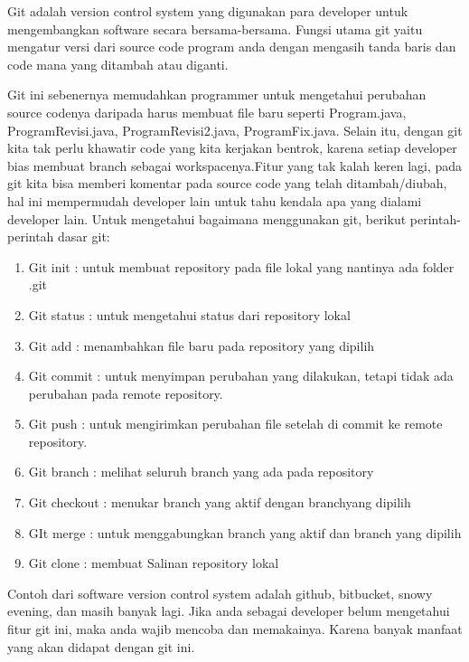 
Git adalah version control system yang digunakan para developer untuk 
mengembangkan software secara bersama-bersama. Fungsi utama git yaitu 
mengatur versi dari source code program anda dengan mengasih tanda baris 
dan code mana yang ditambah atau diganti.
\vspace{12pt}

Git ini sebenernya memudahkan programmer untuk mengetahui perubahan 
source codenya daripada harus membuat file baru seperti Program.java, 
ProgramRevisi.java, ProgramRevisi2.java, ProgramFix.java. Selain itu, 
dengan git kita tak perlu khawatir code yang kita kerjakan bentrok, 
karena setiap developer bias membuat branch sebagai workspacenya.Fitur 
yang tak kalah keren lagi, pada git kita bisa memberi komentar pada 
source code yang telah ditambah/diubah, hal ini mempermudah developer 
lain untuk tahu kendala apa yang dialami developer lain.
\vspace{12pt}
Untuk mengetahui bagaimana menggunakan git, berikut perintah-perintah 
dasar git:

\begin{enumerate}
\item Git init : untuk membuat repository pada file lokal yang nantinya 
ada folder .git
\item Git status : untuk mengetahui status dari repository lokal
\item Git add : menambahkan file baru pada repository yang dipilih
\item Git commit : untuk menyimpan perubahan yang dilakukan, tetapi 
tidak ada perubahan pada remote repository.
\item Git push : untuk mengirimkan perubahan file setelah di commit ke 
remote repository.
\item Git branch : melihat seluruh branch yang ada pada repository
\item Git checkout : menukar branch yang aktif dengan branchyang dipilih
\item GIt merge : untuk menggabungkan branch yang aktif dan branch yang 
dipilih
\item Git clone : membuat Salinan repository lokal
\setcounter{numberedCntE}{\theenumi}
\end{enumerate}
Contoh dari software version control system adalah github, bitbucket, 
snowy evening, dan masih banyak lagi. Jika anda sebagai developer belum 
mengetahui fitur git ini, maka anda wajib mencoba dan memakainya. Karena 
banyak manfaat yang akan didapat dengan git ini.
\vspace{12pt}

